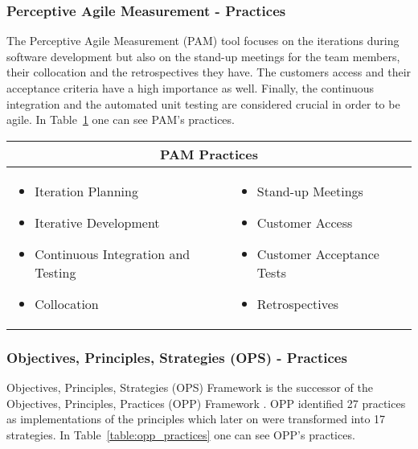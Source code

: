 \subsubsection[\ac{PAM} Practices]{Perceptive Agile Measurement - Practices}
The Perceptive Agile Measurement (\ac{PAM}) tool focuses on the iterations during software development but also on the stand-up meetings for the team members, their collocation and the retrospectives they have. The customers access and their acceptance criteria have a high importance as well. Finally, the continuous integration and the automated unit testing are considered crucial in order to be agile. In Table~\ref{table:pam_practices} one can see \ac{PAM}'s practices.

\begin{table} [H]
  \begin{tabular}{| p{6cm} p{6cm} |}
    \hline
    \multicolumn{2}{|c|}{\textbf{\ac{PAM} Practices}}  \\ \hline
    	\begin{itemize} \item Iteration Planning \item Iterative Development \item Continuous Integration and Testing \item Collocation \end{itemize} &
     \begin{itemize} \item Stand-up Meetings \item Customer Access \item Customer Acceptance Tests \item Retrospectives \end{itemize}  \\ \hline
  \end{tabular}
  \label{table:pam_practices}
\end{table}

\subsubsection[\ac{OPS} Practices]{Objectives, Principles, Strategies (OPS) - Practices}
Objectives, Principles, Strategies (\ac{OPS}) Framework is the successor of the Objectives, Principles, Practices (\ac{OPP}) Framework \cite{opp}. \ac{OPP} identified 27 practices as implementations of the principles which later on were transformed into 17 strategies. In Table~\ref{table:opp_practices} one can see \ac{OPP}'s practices. 


